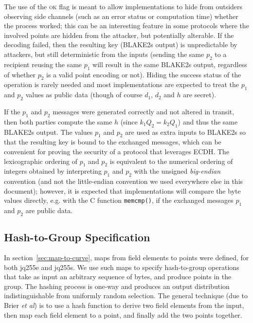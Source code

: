 \documentclass{llncs}
\begin{document}
The use of the \textsc{ok} flag is meant to allow implementations to
hide from outsiders observing side channels (such as an error status or
computation time) whether the process worked; this can be an interesting
feature in some protocols where the involved points are hidden from the
attacker, but potentially alterable. If the decoding failed, then the
resulting key (BLAKE2s output) is unpredictable by attackers, but still
deterministic from the inputs (sending the same $p_2$ to a recipient
reusing the same $p_1$ will result in the same BLAKE2s output,
regardless of whether $p_2$ is a valid point encoding or not). Hiding
the success status of the operation is rarely needed and most
implementations are expected to treat the $p_1$ and $p_2$ values as
public data (though of course $d_1$, $d_2$ and $h$ are secret).

If the $p_1$ and $p_2$ messages were generated correctly and not altered
in transit, then both parties compute the same $h$ (since $k_1 Q_2 = k_2
Q_1$) and thus the same BLAKE2s output. The values $p_1$ and $p_2$ are
used as extra inputs to BLAKE2s so that the resulting key is bound to
the exchanged messages, which can be convenient for proving the security
of a protocol that leverages ECDH. The lexicographic ordering of $p_1$
and $p_2$ is equivalent to the numerical ordering of integers obtained
by interpreting $p_1$ and $p_2$ with the unsigned \emph{big-endian}
convention (and not the little-endian convention we used everywhere else
in this document); however, it is expected that implementations will
compare the byte values directly, e.g. with the C function
\verb+memcmp()+, if the exchanged messages $p_1$ and $p_2$ are public
data.

\subsection{Hash-to-Group Specification}\label{sec:spec-hash-to-curve}

In section~\ref{sec:map-to-curve}, maps from field elements to points
were defined, for both jq255e and jq255s. We use such maps to specify
hash-to-group operations that take as input an arbitrary sequence of
bytes, and produce points in the group. The hashing process is one-way
and produces an output distribution indistinguishable from uniformly
random selection. The general technique (due to Brier \emph{et
al}\cite{BriCorIcaMadRanTib2010}) is to use a hash function to derive
two field elements from the input, then map each field element to a
point, and finally add the two points together.
\end{document}
